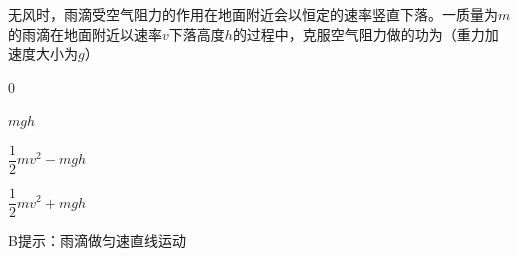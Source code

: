 无风时，雨滴受空气阻力的作用在地面附近会以恒定的速率竖直下落。一质量为\(m\)的雨滴在地面附近以速率\(v\)下落高度\(h\)的过程中，克服空气阻力做的功为（重力加速度大小为\(g\)）\paren[]
\begin{choices}
	\item 0
	\item \(mgh\)
	\item \(\dfrac{1}{2}mv^2 - mgh\)
	\item \(\dfrac{1}{2}mv^2 + mgh\)
\end{choices}
\begin{answer}
	B\qquad 提示：雨滴做匀速直线运动
\end{answer}